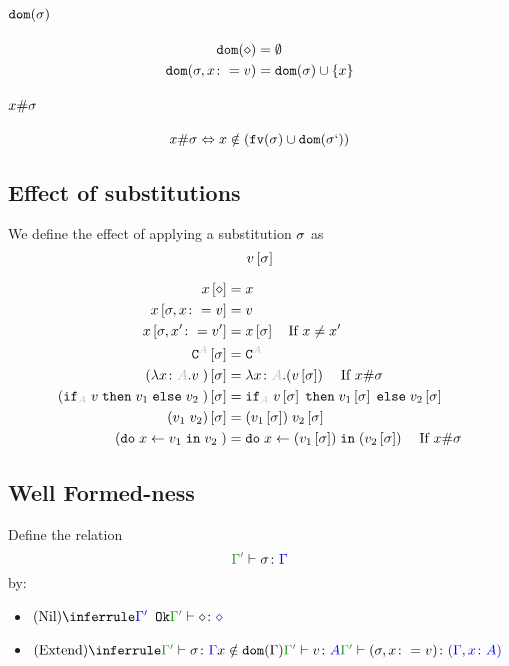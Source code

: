 \documentclass{report}
\begin{document}
\paragraph{$\texttt{dom}(\sigma)$}
\begin{align}
    \texttt{dom}(\diamond) & = \emptyset\\
    \texttt{dom}(\sigma, x\colon= v) & = \texttt{dom}(\sigma)\cup\left\{x\right\}
\end{align}

\paragraph{$x \# \sigma$}
\begin{equation}
    x \# \sigma \Leftrightarrow x\notin(\texttt{fv}(\sigma)\cup\texttt{dom}(\sigma`))
\end{equation}

\subsection{Effect of substitutions}
    We define the effect of applying a substitution $\sigma$ as 
    $$v\left[\sigma\right]$$

    
    \begin{align}
        x\sub{\nil} & = x \\
        x\sub{\si,x\setto v} & = v \\
        x\sub{\si,x'\setto v'} & = x\ssi\qt{If }x \neq x'\\
        \const{A}\ssi & = \const{A} \\
        (\lam{x}{A}{v})\ssi &= \lam{x}{A}{(v\ssi)}\qt{If }x\#\si\\
        (\pifthenelse{A}{v}{v_1}{v_2})\ssi &= \pifthenelse{A}{v\ssi}{v_1\ssi}{v_2\ssi}\\
        (\apply{v_1}{v_2})\ssi&= \apply{(v_1\ssi)}{v_2\ssi}\\
        (\doin{x}{v_1}{v_2})&= \doin{x}{(v_1\ssi)}{(v_2\ssi)}\qt{If } x\#\si\\
    \end{align}
\subsection{Well Formed-ness}
Define the relation $$\typerelation{\G'}{\si}{\G}$$ by:

\begin{itemize}
    \item $\ntreeruleI{Nil}{\ok{\G'}}{\typerelation{\G'}{\nil}{\nil}}$
    \item $\ntreeruleIII{Extend}{
        \typerelation{\G'}{\si}{\G}
        }{
        x\notin\dom{\G}
        }{
        \typerelation{\G'}{v}{A}
    }{
        \typerelation{\G'}{(\si, x \setto v)}{(\gax)}
    }$
\end{itemize}
\end{document}
